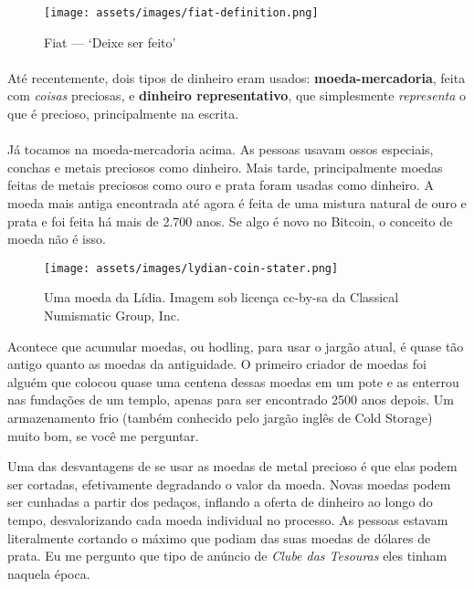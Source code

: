 \begin{figure}
  \centering
  \texttt{[image: assets/images/fiat-definition.png]}
  \caption{Fiat --- `Deixe ser feito'}
  \label{fig:fiat-definition}
\end{figure}

\paragraph{}
Até recentemente, dois tipos de dinheiro eram usados: \textbf{moeda-mercadoria}, feita com \textit{coisas} preciosas, e \textbf{dinheiro representativo}, que simplesmente \textit{representa} o que é precioso, principalmente na escrita.

\paragraph{}
Já tocamos na moeda-mercadoria acima. As pessoas usavam ossos especiais, conchas e metais preciosos como dinheiro. Mais tarde, principalmente moedas feitas de metais preciosos como ouro e prata foram usadas como dinheiro. A moeda mais antiga encontrada até agora é feita de uma mistura natural de ouro e prata e foi feita há mais de 2.700 anos.  Se algo é novo no Bitcoin, o conceito de moeda não é isso.

\begin{figure}
  \centering
  \texttt{[image: assets/images/lydian-coin-stater.png]}
  \caption{Uma moeda da Lídia. Imagem sob licença cc-by-sa da Classical Numismatic Group, Inc.}
  \label{fig:lydian-coin-stater}
\end{figure}

Acontece que acumular moedas, ou hodling, para usar o jargão atual, é quase tão antigo quanto as moedas da antiguidade. O primeiro criador de moedas foi alguém que colocou quase uma centena dessas moedas em um pote e as enterrou nas fundações de um templo, apenas para ser encontrado 2500 anos depois. Um armazenamento frio (também conhecido pelo jargão inglês de Cold Storage) muito bom, se você me perguntar.

Uma das desvantagens de se usar as moedas de metal precioso é que elas podem ser cortadas, efetivamente degradando o valor da moeda. Novas moedas podem ser cunhadas a partir dos pedaços, inflando a oferta de dinheiro ao longo do tempo, desvalorizando cada moeda individual no processo. As pessoas estavam literalmente cortando o máximo que podiam das suas moedas de dólares de prata. Eu me pergunto que tipo de anúncio de \textit{Clube das Tesouras} eles tinham naquela época.

